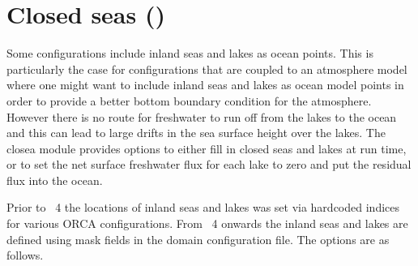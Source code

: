 \documentclass[../main/NEMO_manual]{subfiles}
\begin{document}
\section[Closed seas (\textit{closea.F90})]{Closed seas (\protect{})}
\label{sec:MISC_closea}

Some configurations include inland seas and lakes as ocean
points. This is particularly the case for configurations that are
coupled to an atmosphere model where one might want to include inland
seas and lakes as ocean model points in order to provide a better
bottom boundary condition for the atmosphere. However there is no
route for freshwater to run off from the lakes to the ocean and this
can lead to large drifts in the sea surface height over the lakes. The
closea module provides options to either fill in closed seas and lakes
at run time, or to set the net surface freshwater flux for each lake
to zero and put the residual flux into the ocean.

Prior to \NEMO\ 4 the locations of inland seas and lakes was set via
hardcoded indices for various ORCA configurations. From \NEMO\ 4 onwards
the inland seas and lakes are defined using mask fields in the
domain configuration file. The options are as follows.
\end{document}

